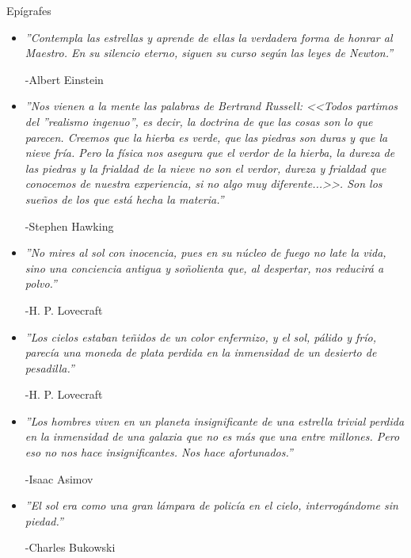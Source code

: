 Epígrafes
\begin{itemize}
\item \textit{''Contempla las estrellas y aprende de ellas
la verdadera forma de honrar al Maestro.
En su silencio eterno, siguen su curso
según las leyes de Newton.''}

-Albert Einstein

\item \textit{''Nos vienen a la mente las palabras de Bertrand Russell: 
<<Todos partimos del ''realismo ingenuo'', es decir, la doctrina de que
 las cosas son lo que parecen. Creemos que la hierba es verde, que las 
 piedras son duras y que la nieve fría. Pero la física nos asegura que 
 el verdor de la hierba, la dureza de las piedras y la frialdad de la nieve 
 no son el verdor, dureza y frialdad que conocemos de nuestra experiencia, 
 si no algo muy diferente...>>. Son los sueños de los que está hecha la materia.''}

-Stephen Hawking

\item \textit{''No mires al sol con inocencia, pues en su núcleo de fuego no late la vida, sino una conciencia antigua y soñolienta que, al despertar, nos reducirá a polvo.''}

-H. P. Lovecraft

\item \textit{''Los cielos estaban teñidos de un color enfermizo, y el sol, pálido y frío, parecía una moneda de plata perdida en la inmensidad de un desierto de pesadilla.''}

-H. P. Lovecraft

\item \textit{''Los hombres viven en un planeta insignificante de una estrella trivial perdida en la inmensidad de una galaxia que no es más que una entre millones. Pero eso no nos hace insignificantes. Nos hace afortunados.''}

-Isaac Asimov

\item \textit{''El sol era como una gran lámpara de policía en el cielo, interrogándome sin piedad.''}

-Charles Bukowski

\end{itemize}


